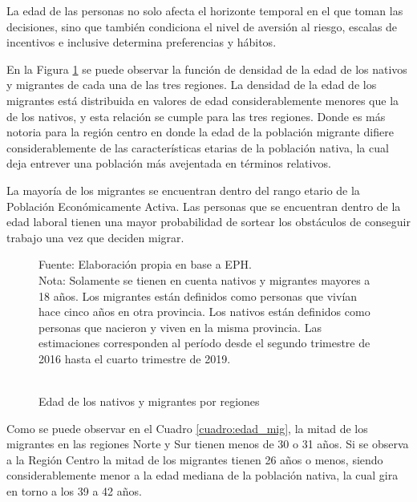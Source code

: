 \documentclass[12pt,a4paper]{article}
\begin{document}
\newpage
La edad de las personas no solo afecta el horizonte temporal en el que toman las decisiones, sino que también condiciona el nivel de aversión al riesgo, escalas de incentivos e inclusive determina preferencias y hábitos.

En la Figura \ref{figure:edad_mig} se puede observar la función de densidad de la edad de los nativos y migrantes de cada una de las tres regiones. La densidad de la edad de los migrantes está distribuida  en valores de edad considerablemente menores que la de los nativos, y esta relación se cumple para las tres regiones. Donde es más notoria para la región centro en donde la edad de la población migrante difiere considerablemente de las características etarias de la población nativa, la cual deja entrever una población más avejentada en términos relativos.

La mayoría de los migrantes se encuentran dentro del rango etario de la Población Económicamente Activa. Las personas que se encuentran dentro de la edad laboral tienen una mayor probabilidad de sortear los obstáculos de conseguir trabajo una vez que deciden migrar.

\begin{figure}[ht!]
\begin{center}
\caption{\\Edad de los nativos y migrantes por regiones}
 
\label{figure:edad_mig}
\begin{flushleft}
\begin{scriptsize}
Fuente: Elaboración propia en base a EPH.\\
Nota: Solamente se tienen en cuenta nativos y migrantes mayores a 18 años. Los migrantes están definidos como personas que vivían hace cinco años en otra provincia. Los nativos están definidos como personas que nacieron y viven en la misma provincia. Las estimaciones corresponden al período desde el segundo trimestre de 2016 hasta el cuarto trimestre de 2019.
\end{scriptsize}
\end{flushleft}
\end{center}
\end{figure}

\newpage
Como se puede observar en el Cuadro \ref{cuadro:edad_mig}, la mitad de los migrantes en las regiones Norte y Sur tienen menos de 30 o 31 años. Si se observa a la Región Centro la mitad de los migrantes tienen 26 años o menos, siendo considerablemente menor a la edad mediana de la población nativa, la cual gira en torno a los 39 a 42 años.
\end{document}
